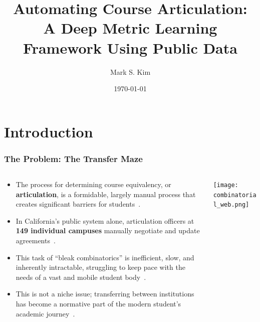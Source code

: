 \documentclass[aspectratio=169,10pt]{beamer}
\title[Automating Course Articulation]{Automating Course Articulation:\\A Deep Metric Learning Framework Using Public Data}
\author{Mark S. Kim}
\institute[SFSU]{San Francisco State University \\ Department of Data Science and Artificial Intelligence}
\date{\today}
\begin{document}
\section{Introduction}
\begin{frame}
    \titlepage
\end{frame}

\begin{frame}
    \frametitle{The Problem: The Transfer Maze}
    
    \begin{columns}[T] %
        
        \begin{column}{0.6\textwidth} %
            \begin{itemize}
                \item The process for determining course equivalency, or \textbf{articulation}, is a formidable, largely manual process that creates significant barriers for students~\cite{pardos2019}.
                
                \item In California's public system alone, articulation officers at \textbf{149 individual campuses} manually negotiate and update agreements~\cite{assistfaq, ppic, calstate, cccco}.
                
                \item This task of ``bleak combinatorics'' is inefficient, slow, and inherently intractable, struggling to keep pace with the needs of a vast and mobile student body~\cite{pardos2019}.
                
                \item This is not a niche issue; transferring between institutions has become a normative part of the modern student's academic journey~\cite{publicagenda2025}.
            \end{itemize}
        \end{column}
        
        \begin{column}{0.4\textwidth}
            
            \centering
            \texttt{[image: combinatorial\_web.png]}
            
        \end{column}
        
    \end{columns}
\end{frame}
\end{document}
